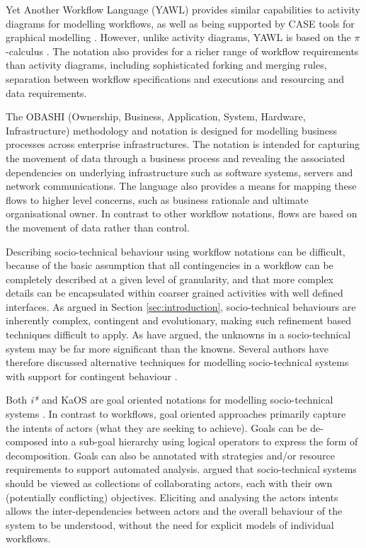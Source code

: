 \documentclass{sig-alternate}
\newcommand{\picalc}{\(\pi\)-calculus }
\begin{document}
Yet Another Workflow Language (YAWL) provides similar capabilities to activity
diagrams for modelling workflows, as well as being supported by CASE tools for
graphical modelling \citep{hofstede2010yawl}.  However, unlike activity diagrams,
YAWL is based on the \picalc\citep{Aalst2004}.  The notation also provides for a
richer range of workflow requirements than activity diagrams, including
sophisticated forking and merging rules, separation between workflow
specifications and executions and resourcing and data requirements.

The OBASHI (Ownership, Business, Application, System, Hardware, Infrastructure)
methodology and notation \citep{obashimethodology} is designed for modelling
business processes across enterprise infrastructures.  The notation is intended
for capturing the movement of data through a business process and revealing the
associated dependencies on underlying infrastructure such as software systems,
servers and network communications.  The language also provides a means for
mapping these flows to higher level concerns, such as business rationale and
ultimate organisational owner. In contrast to other workflow notations, flows
are based on the movement of data rather than control.


Describing socio-technical behaviour using workflow notations can be difficult,
because of the basic assumption that all contingencies in a workflow can be
completely described at a given level of granularity, and that more complex
details can be encapsulated within coarser grained activities with well defined
interfaces.  As argued in Section \ref{sec:introduction}, socio-technical
behaviours are inherently complex, contingent and evolutionary, making such
refinement based techniques difficult to apply.  As
\citet{israilidis13ignorance} have argued, the unknowns in a socio-technical
system may be far more significant than the knowns. Several authors have
therefore discussed alternative techniques for modelling socio-technical systems
with support for contingent behaviour
\citep{yu1995,dardenne93goal,Herrmann1999,sommerville09deriving}.

Both \emph{i*}\citet{yu1995} and KaOS \citet{dardenne93goal} are goal oriented
notations for modelling socio-technical systems \citep{Werneck2009}.  In
contrast to workflows, goal oriented approaches primarily capture the intents of
actors (what they are seeking to achieve).  Goals can be de-composed into a
sub-goal hierarchy using logical operators to express the form of
decomposition. Goals can also be annotated with strategies and/or resource
requirements to support automated analysis.  \citeauthor{yu1995} argued that
socio-technical systems should be viewed as collections of collaborating actors,
each with their own (potentially conflicting) objectives.  Eliciting and
analysing the actors intents allows the inter-dependencies between actors and
the overall behaviour of the system to be understood, without the need for
explicit models of individual workflows.
\end{document}

